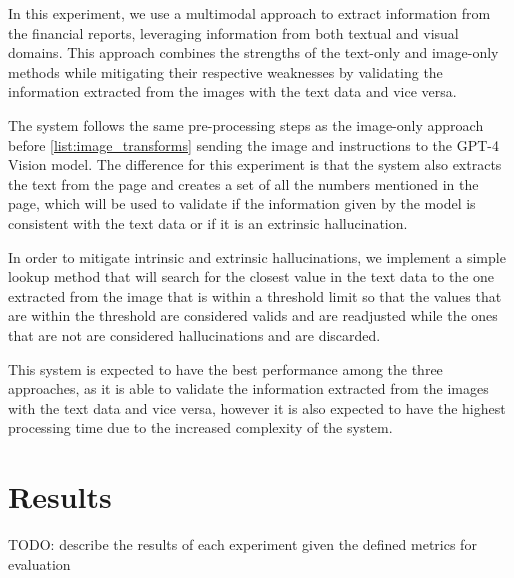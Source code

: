 \documentclass[english, 12pt, a4paper, elec, utf8, a-2b, online]{aaltothesis}
\begin{document}
In this experiment, we use a multimodal approach to extract information from the financial reports, leveraging information from both textual and visual domains.
This approach combines the strengths of the text-only and image-only methods while mitigating their respective weaknesses by validating the information extracted from the images with the text data and vice versa.

The system follows the same pre-processing steps as the image-only approach before \ref{list:image_transforms} sending the image and instructions to the \ac{GPT}-4 Vision model.
The difference for this experiment is that the system also extracts the text from the page and creates a set of all the numbers mentioned in the page, which will be used to validate if the information given by the model is consistent with the text data or if it is an extrinsic hallucination.

In order to mitigate intrinsic and extrinsic hallucinations, we implement a simple lookup method that will search for the closest value in the text data to the one extracted from the image that is within a threshold limit so that the values that are within the threshold are considered valids and are readjusted while the ones that are not are considered hallucinations and are discarded.

This system is expected to have the best performance among the three approaches, as it is able to validate the information extracted from the images with the text data and vice versa, however it is also expected to have the highest processing time due to the increased complexity of the system.

\clearpage
\section{Results}

TODO: describe the results of each experiment given the defined metrics for evaluation

\end{document}
